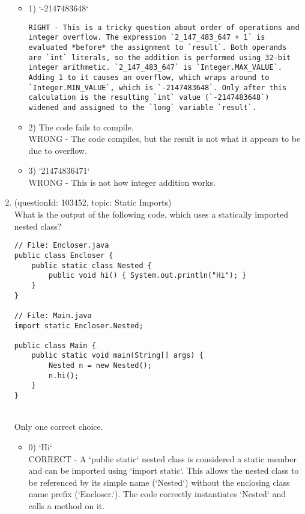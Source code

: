 \documentclass[12pt]{article}
\begin{document}
\begin{enumerate}[label=(\arabic*)]
\begin{itemize}
\item 1) `-2147483648`
 \\ 
\begin{verbatim}RIGHT - This is a tricky question about order of operations and integer overflow. The expression `2_147_483_647 + 1` is evaluated *before* the assignment to `result`. Both operands are `int` literals, so the addition is performed using 32-bit integer arithmetic. `2_147_483_647` is `Integer.MAX_VALUE`. Adding 1 to it causes an overflow, which wraps around to `Integer.MIN_VALUE`, which is `-2147483648`. Only after this calculation is the resulting `int` value (`-2147483648`) widened and assigned to the `long` variable `result`.\end{verbatim}

\item 2) The code fails to compile.
 \\ 
WRONG - The code compiles, but the result is not what it appears to be due to overflow.

\item 3) `21474836471`
 \\ 
WRONG - This is not how integer addition works.

\end{itemize}
\item (questionId: 103452, topic: Static Imports) \\ 
What is the output of the following code, which uses a statically imported nested class?
\begin{verbatim}
// File: Encloser.java
public class Encloser {
    public static class Nested {
        public void hi() { System.out.println("Hi"); }
    }
}

// File: Main.java
import static Encloser.Nested;

public class Main {
    public static void main(String[] args) {
        Nested n = new Nested();
        n.hi();
    }
}
\end{verbatim}
\\ \noindent Only one correct choice. 
\begin{itemize}
\item 0) `Hi`
 \\ 
CORRECT - A `public static` nested class is considered a static member and can be imported using `import static`. This allows the nested class to be referenced by its simple name (`Nested`) without the enclosing class name prefix (`Encloser.`). The code correctly instantiates `Nested` and calls a method on it.


\end{itemize}
\end{enumerate}
\end{document}
